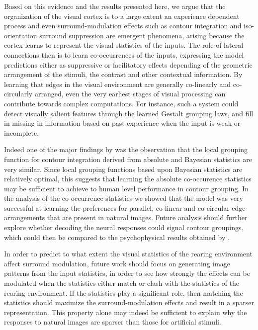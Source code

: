 Based on this evidence and the results presented here, we argue that
the organization of the visual cortex is to a large extent an
experience dependent process and even surround-modulation effects such
as contour integration and iso-orientation surround suppression are
emergent phenomena, arising because the cortex learns to represent the
visual statistics of the inputs. The role of lateral connections then
is to learn co-occurrences of the inputs, expressing the model
predictions either as suppressive or facilitatory effects depending of
the geometric arrangement of the stimuli, the contrast and other
contextual information. By learning that edges in the visual
environment are generally co-linearly and co-circularly arranged, even
the very earliest stages of visual processing can contribute towards
complex computations. For instance, such a system could detect
visually salient features through the learned Gestalt grouping laws,
and fill in missing in information based on past experience when the
input is weak or incomplete.

Indeed one of the major findings by \cite{Geisler2001} was the
observation that the local grouping function for contour integration
derived from absolute and Bayesian statistics are very similar. Since
local grouping functions based upon Bayesian statistics are relatively
optimal, this suggests that learning the absolute co-occurence
statistics may be sufficient to achieve to human level performance in
contour grouping. In the analysis of the co-occurrence statistics we
showed that the model was very successful at learning the preferences
for parallel, co-linear and co-circular edge arrangements that are
present in natural images. Future analysis should further explore
whether decoding the neural responses could signal contour groupings,
which could then be compared to the psychophysical results obtained by
\cite{Geisler2001}.

In order to predict to what extent the visual statistics of the
rearing environment affect surround modulation, future
work should focus on generating image patterns from the input
statistics, in order to see how strongly the effects can be modulated
when the statistics either match or clash with the statistics of the
rearing environment. If the statistics play a significant role, then
matching the statistics should maximize the surround-modulation
effects and result in a sparser representation. This property alone
may indeed be sufficient to explain why the responses to natural
images are sparser than those for artificial stimuli.

